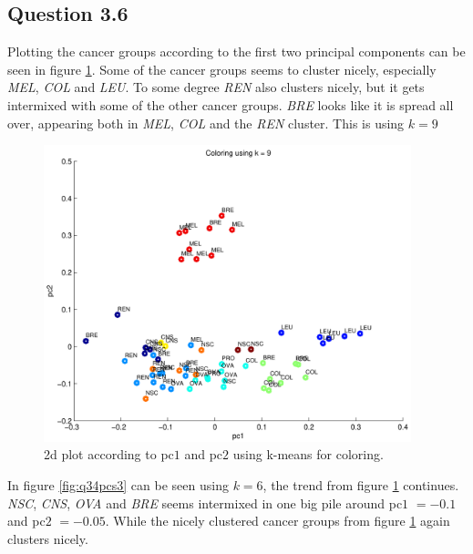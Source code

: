 \subsection*{Question 3.6}

Plotting the cancer groups according to the first two principal
components can be seen in figure \ref{fig:q34pcs2}. Some of the cancer
groups seems to cluster nicely, especially \emph{MEL}, \emph{COL} and
\emph{LEU}. To some degree \emph{REN} also clusters nicely, but it
gets intermixed with some of the other cancer groups. \emph{BRE} looks
like it is spread all over, appearing both in \emph{MEL}, \emph{COL}
and the \emph{REN} cluster. This is using $k = 9$

\begin{figure}[!htbp]
  \centering \includegraphics[width=0.95\textwidth]{./images/q34pcs2}
  \caption{2d plot according to pc$1$ and pc$2$ using k-means for
    coloring.}
  \label{fig:q34pcs2}
\end{figure}

\newpage

In figure \ref{fig:q34pcs3} can be seen using $k = 6$, the trend from
figure \ref{fig:q34pcs2} continues. \emph{NSC}, \emph{CNS}, \emph{OVA}
and \emph{BRE} seems intermixed in one big pile around pc$1$ $= -0.1$
and pc$2$ $= -0.05$. While the nicely clustered cancer groups from
figure \ref{fig:q34pcs2} again clusters nicely.

